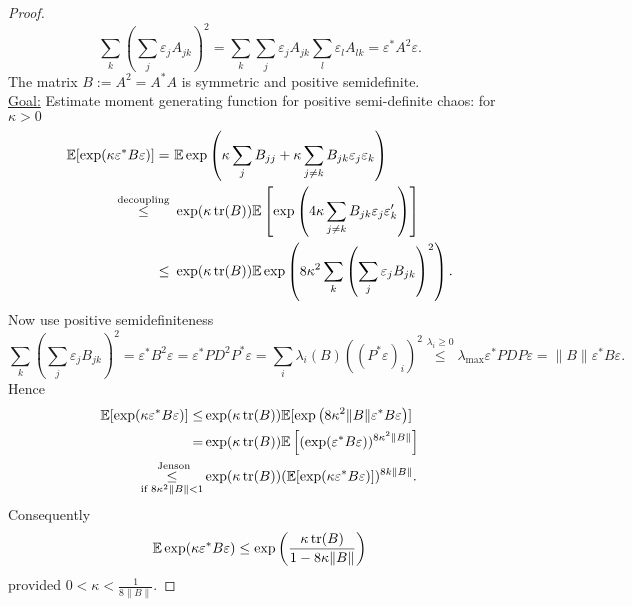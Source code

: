 \begin{theorem}
\begin{proof}
\begin{equation*}
\sum_k \left( \sum_j \varepsilon_j A_{jk}\right)^2 = \sum_k  \sum_j \varepsilon_j A_{jk} \sum_l \varepsilon_l A_{lk}  =\varepsilon^* A^2 \varepsilon.
\end{equation*}
The matrix $B:=A^2=A^*A$ is symmetric and positive semidefinite. \\
\underline{Goal:} Estimate moment generating function for positive semi-definite chaos: for $\kappa >0$
\begin{equation*}
\begin{split}
\mathbb{E} [\exp (\kappa \varepsilon^* B \varepsilon)] =\  &  \mathbb{E} \exp\left( 
\kappa\sum_jB_{jj}+\kappa\sum_{j\neq k}B_{jk}\varepsilon_j\varepsilon_k
\right)		\\
\overset{\text{decoupling}}\leq \  &
\exp(\kappa\operatorname{tr}(B)) \mathbb{E} \left[\exp\left(4\kappa\sum_{j\neq k}B_{jk}\varepsilon_j \varepsilon_k'\right)\right] \\
\leq \ & \exp(\kappa\operatorname{tr}(B))\mathbb{E} \exp \left(
8\kappa^2 \sum_k \left( 
\sum_j \varepsilon_jB_{jk}
\right)^2
\right).
\end{split}
\end{equation*}
Now use positive semidefiniteness
\begin{equation*}
\sum_k \left(\sum_j
\varepsilon_j B_{jk} 
 \right)^2 = \varepsilon^* B^2 \varepsilon = \varepsilon^* PD^2P^*\varepsilon = \sum_i \lambda_i(B) ((P^*\varepsilon)_i)^2 \overset{\lambda_i \geq 0}\leq \lambda_{\max} \varepsilon^*PDP\varepsilon = \|B\|\varepsilon^* B\varepsilon.
\end{equation*}
Hence
\begin{equation*}
\begin{split}
\mathbb{E} [\exp(\kappa\varepsilon^* B \varepsilon)]
\leq  &
 \exp(\kappa\operatorname{tr}(B))\mathbb{E} [\exp\left(
8\kappa^2 \|B\|\varepsilon^* B \varepsilon
\right)] \\
= &
\exp(\kappa\operatorname{tr}(B)) \mathbb{E} \left[ 
(\exp(\varepsilon^*B\varepsilon))^{8\kappa^2\|B\|}
\right] \\
\underset{\text{if } 
8\kappa^2\|B\|< 1} {\overset{\text{
Jenson}}{\leq}}  & \exp (\kappa\operatorname{tr} (B)) (\mathbb{E}[\exp(\kappa\varepsilon^*B\varepsilon)])^{8k\|B\|}.
\end{split}
\end{equation*}
Consequently
\begin{equation*}
\mathbb{E} \exp(\kappa\varepsilon^* B\varepsilon) \leq \exp \left(
\frac{\kappa\operatorname{tr}(B)}{1-8\kappa\|B\|}
 \right) 
\end{equation*}
provided $0<\kappa< \frac{1}{8\|B\|}$.

\end{proof}
\end{theorem}

